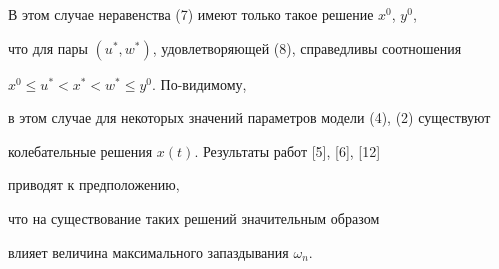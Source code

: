 В этом случае неравенства (7) имеют только такое решение $x^{0}$, $y^{0}$,


что для пары $(u^{*}, w^{*})$, удовлетворяющей (8), справедливы соотношения


$x^{0} \leq u^{*} < x^{*} < w^{*} \leq y^{0}$. По-видимому,


в этом случае для некоторых значений параметров модели (4), (2) существуют


колебательные решения $x(t)$. Результаты работ [5], [6], [12]


приводят к предположению,


что на существование таких решений значительным образом


влияет величина максимального запаздывания $\omega_{n}$.





